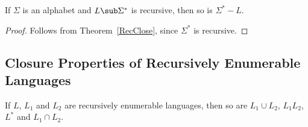\begin{corollary}
\label{RecComp}

If $\Sigma$ is an alphabet and $L\sub\Sigma^*$ is recursive,
then so is $\Sigma^*-L$.
\end{corollary}

\begin{proof}
Follows from Theorem~\ref{RecClose}, since $\Sigma^*$ is recursive.
\end{proof}
\subsection{Closure Properties of Recursively Enumerable Languages}

\begin{theorem}
If $L$, $L_1$ and $L_2$ are recursively enumerable languages, then so
are $L_1\cup L_2$, $L_1L_2$, $L^*$ and $L_1\cap L_2$.
\end{theorem}

